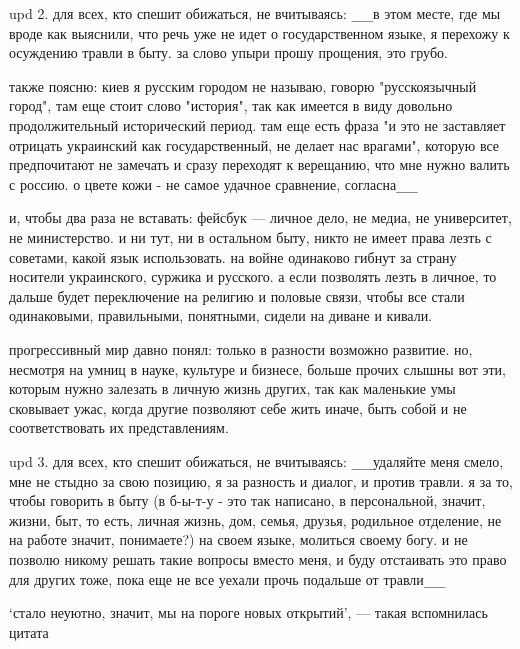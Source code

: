 upd 2. для всех, кто спешит обижаться, не вчитываясь: \verb|___|в этом месте,
где мы вроде как выяснили, что речь уже не идет о государственном языке, я
перехожу к осуждению травли в быту. за слово упыри прошу прощения, это грубо. 

также поясню: киев я русским городом не называю, говорю "русскоязычный город",
там еще стоит слово "история", так как имеется в виду довольно продолжительный
исторический период. там еще есть фраза "и это не заставляет отрицать
украинский как государственный, не делает нас врагами", которую все
предпочитают не замечать и сразу переходят к верещанию, что мне нужно валить с
россию. о цвете кожи - не самое удачное сравнение, согласна\verb|___|

и, чтобы два раза не вставать: фейсбук — личное дело, не медиа, не университет,
не министерство. и ни тут, ни в остальном быту, никто не имеет права лезть с
советами, какой язык использовать. на войне одинаково гибнут за страну носители
украинского, суржика и русского. а если позволять лезть в личное, то дальше
будет переключение на религию и половые связи, чтобы все стали одинаковыми,
правильными, понятными, сидели на диване и кивали.

прогрессивный мир давно понял: только в разности возможно развитие. но,
несмотря на умниц в науке, культуре и бизнесе, больше прочих слышны вот эти,
которым нужно залезать в личную жизнь других, так как маленькие умы сковывает
ужас, когда другие позволяют себе жить иначе, быть собой и не соответствовать
их представлениям.

upd 3. для всех, кто спешит обижаться, не вчитываясь: \verb|___|удаляйте меня
смело, мне не стыдно за свою позицию, я за разность и диалог, и против травли.
я за то, чтобы говорить в быту (в б-ы-т-у - это так написано, в персональной,
значит, жизни, быт, то есть, личная жизнь, дом, семья, друзья, родильное
отделение, не на работе значит, понимаете?) на своем языке, молиться своему
богу. и не позволю никому решать такие вопросы вместо меня, и буду отстаивать
это право для других тоже, пока еще не все уехали прочь подальше от травли\verb|___|

‘стало неуютно, значит, мы на пороге новых открытий’, — такая вспомнилась
цитата

